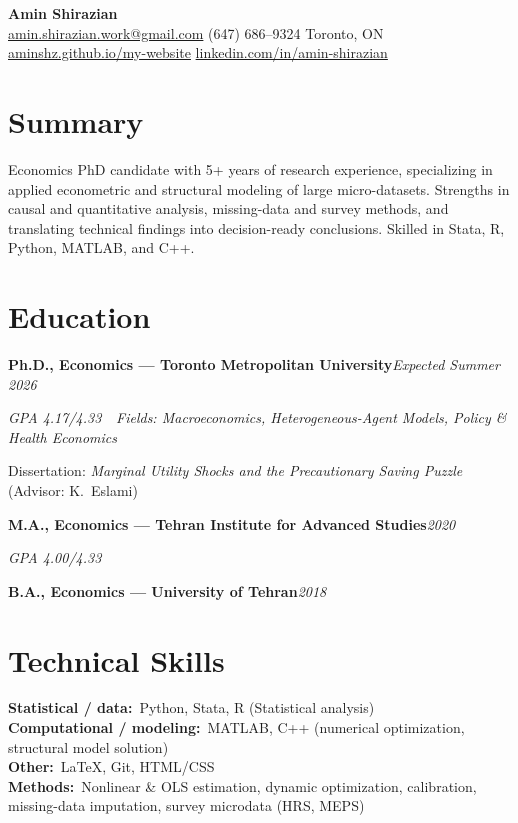 \documentclass[10pt]{article}
\newcommand{\headingfont}{\fontfamily{qhv}\selectfont} %
\newcommand{\entry}[2]{%
  \noindent\textbf{#1}\hfill{\small\itshape #2}\par\vspace{1pt}}
\newcommand{\subentry}[1]{\noindent\textit{#1}\par\vspace{1pt}}
\begin{document}
{\headingfont\bfseries\fontsize{22}{24}\selectfont\color{accent} Amin Shirazian}\\[3pt]
{\headingfont\small
\href{mailto:amin.shirazian.work@gmail.com}{amin.shirazian.work@gmail.com} \quad\textbar\quad
(647) 686--9324 \quad\textbar\quad
Toronto, ON \\[2pt]
\href{https://aminshz.github.io/my-website}{aminshz.github.io/my-website} \quad\textbar\quad
\href{https://linkedin.com/in/amin-shirazian}{linkedin.com/in/amin-shirazian} 
}


\section*{Summary}

\vspace{-1pt}
{\small Economics PhD candidate with 5+ years of research experience, specializing in applied econometric and structural modeling of large micro-datasets. Strengths in causal and quantitative analysis, missing-data and survey methods, and translating technical findings into decision-ready conclusions. Skilled in Stata, R, Python, MATLAB, and C++.}

\section{Education}
\entry{Ph.D., Economics — Toronto Metropolitan University}{Expected Summer 2026}
\subentry{GPA 4.17/4.33 \,\textbar\, Fields: Macroeconomics, Heterogeneous-Agent Models, Policy \& Health Economics}
\vspace{-1pt}
{\small Dissertation: \textit{Marginal Utility Shocks and the Precautionary Saving Puzzle} (Advisor: K.\ Eslami)}
\vspace{2pt}

\entry{M.A., Economics — Tehran Institute for Advanced Studies}{2020}
\subentry{GPA 4.00/4.33}
\vspace{2pt}

\entry{B.A., Economics — University of Tehran}{2018}

\section{Technical Skills}
{\small
\textbf{Statistical / data:}\, Python, Stata, R (Statistical analysis) \\[1.5pt]
\textbf{Computational / modeling:}\, MATLAB, C++ (numerical optimization, structural model solution) \\[2pt]
\textbf{Other:}\, \LaTeX, Git, HTML/CSS \\[1.5pt]
\textbf{Methods:}\, Nonlinear \& OLS estimation, dynamic optimization, calibration, missing-data imputation, survey microdata (HRS, MEPS)
}
\end{document}
